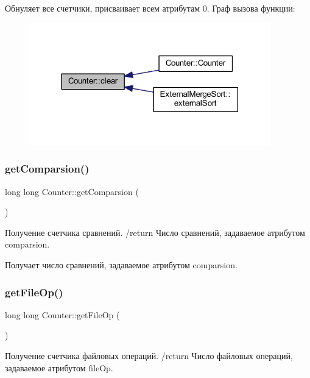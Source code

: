 Обнуляет все счетчики, присваивает всем атрибутам 0. Граф вызова функции\+:\nopagebreak
\begin{figure}[H]
\begin{center}
\leavevmode
\includegraphics[width=297pt]{class_counter_af66c74ac2bc69fa4f30c34377f869596_icgraph}
\end{center}
\end{figure}
\hypertarget{class_counter_a5288fadfdc786d5bf91ae4d04b6a7ab8}{}\label{class_counter_a5288fadfdc786d5bf91ae4d04b6a7ab8} 
\subsubsection{\texorpdfstring{get\+Comparsion()}{getComparsion()}}
{\footnotesize\ttfamily long long Counter\+::get\+Comparsion (\begin{DoxyParamCaption}{ }\end{DoxyParamCaption})}



Получение счетчика сравнений. /return Число сравнений, задаваемое атрибутом comparsion. 

Получает число сравнений, задаваемое атрибутом comparsion. \hypertarget{class_counter_ae84d6627ab98d69b7dd2e5ea243cffed}{}\label{class_counter_ae84d6627ab98d69b7dd2e5ea243cffed} 
\subsubsection{\texorpdfstring{get\+File\+Op()}{getFileOp()}}
{\footnotesize\ttfamily long long Counter\+::get\+File\+Op (\begin{DoxyParamCaption}{ }\end{DoxyParamCaption})}



Получение счетчика файловых операций. /return Число файловых операций, задаваемое атрибутом file\+Op. 

